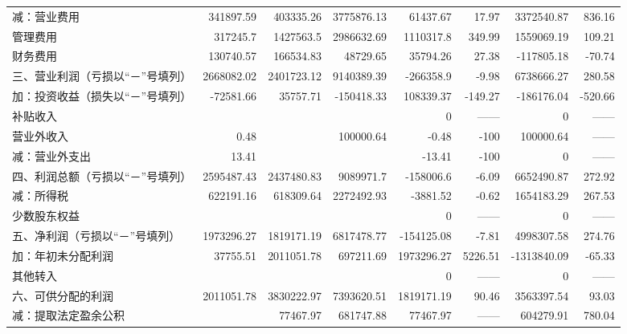 \begin{longtable}{>{\scriptsize}l>{\scriptsize}r>{\scriptsize}r>{\scriptsize}r>{\scriptsize}r>{\scriptsize}r>{\scriptsize}r>{\scriptsize}r}
\hspace{2ex}	      减：营业费用 	&	341897.59	&	403335.26	&	3775876.13	&	61437.67	&	17.97	&	3372540.87	&	836.16	\\
\hspace{2ex}	          管理费用	&	317245.7	&	1427563.5	&	2986632.69	&	1110317.8	&	349.99	&	1559069.19	&	109.21	\\
\hspace{2ex}	          财务费用	&	130740.57	&	166534.83	&	48729.65	&	35794.26	&	27.38	&	-117805.18	&	-70.74	\\
	三、营业利润（亏损以“－”号填列）	&	2668082.02	&	2401723.12	&	9140389.39	&	-266358.9	&	-9.98	&	6738666.27	&	280.58	\\
\hspace{2ex}	     加：投资收益（损失以“－”号填列）	&	-72581.66	&	35757.71	&	-150418.33	&	108339.37	&	-149.27	&	-186176.04	&	-520.66	\\
\hspace{2ex}	         补贴收入	&		&		&		&	0	&	——	&	0	&	——	\\
\hspace{2ex}	         营业外收入	&	0.48	&		&	100000.64	&	-0.48	&	-100	&	100000.64	&	——	\\
\hspace{2ex}	     减：营业外支出    	&	13.41	&		&		&	-13.41	&	-100	&	0	&	——	\\
	四、利润总额（亏损以“－”号填列）	&	2595487.43	&	2437480.83	&	9089971.7	&	-158006.6	&	-6.09	&	6652490.87	&	272.92	\\
\hspace{2ex}	      减：所得税	&	622191.16	&	618309.64	&	2272492.93	&	-3881.52	&	-0.62	&	1654183.29	&	267.53	\\
\hspace{2ex}	          少数股东权益	&		&		&		&	0	&	——	&	0	&	——	\\
	五、净利润（亏损以“－”号填列）	&	1973296.27	&	1819171.19	&	6817478.77	&	-154125.08	&	-7.81	&	4998307.58	&	274.76	\\
\hspace{2ex}	     加：年初未分配利润	&	37755.51	&	2011051.78	&	697211.69	&	1973296.27	&	5226.51	&	-1313840.09	&	-65.33	\\
\hspace{2ex}	        其他转入	&		&		&		&	0	&	——	&	0	&	——	\\
	六、可供分配的利润	&	2011051.78	&	3830222.97	&	7393620.51	&	1819171.19	&	90.46	&	3563397.54	&	93.03	\\
\hspace{2ex}	     减：提取法定盈余公积	&		&	77467.97	&	681747.88	&	77467.97	&	——	&	604279.91	&	780.04	\\

\end{longtable}
